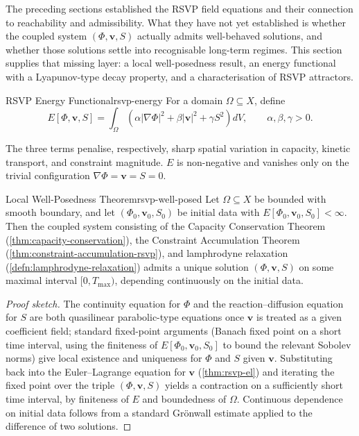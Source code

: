 \documentclass[12pt,twoside,openright]{book}
\begin{document}
The preceding sections established the RSVP field equations
and their connection to reachability and admissibility. What
they have not yet established is whether the coupled system
$(\Phi,\mathbf{v},S)$ actually admits well-behaved solutions,
and whether those solutions settle into recognisable
long-term regimes. This section supplies that missing layer:
a local well-posedness result, an energy functional with a
Lyapunov-type decay property, and a characterisation of RSVP
attractors.

\begin{definition}{RSVP Energy Functional}{rsvp-energy}
  For a domain $\Omega\subseteq X$, define
  \[
    E[\Phi,\mathbf{v},S]
    = \int_\Omega \left(
        \alpha|\nabla\Phi|^2
        + \beta|\mathbf{v}|^2
        + \gamma S^2
      \right) dV,
    \qquad \alpha,\beta,\gamma > 0.
  \]
\end{definition}

The three terms penalise, respectively, sharp spatial
variation in capacity, kinetic transport, and constraint
magnitude. $E$ is non-negative and vanishes only on the
trivial configuration $\nabla\Phi=\mathbf{v}=S=0$.

\begin{theorem}{Local Well-Posedness Theorem}{rsvp-well-posed}
  Let $\Omega\subseteq X$ be bounded with smooth boundary,
  and let $(\Phi_0,\mathbf{v}_0,S_0)$ be initial data with
  $E[\Phi_0,\mathbf{v}_0,S_0] < \infty$. Then the coupled
  system consisting of the Capacity Conservation Theorem
  (\cref{thm:capacity-conservation}), the Constraint
  Accumulation Theorem
  (\cref{thm:constraint-accumulation-rsvp}), and lamphrodyne
  relaxation (\cref{defn:lamphrodyne-relaxation}) admits a
  unique solution $(\Phi,\mathbf{v},S)$ on some maximal
  interval $[0,T_{\max})$, depending continuously on the
  initial data.
\end{theorem}

\begin{proof}[Proof sketch]
  The continuity equation for $\Phi$ and the
  reaction--diffusion equation for $S$ are both
  quasilinear parabolic-type equations once
  $\mathbf{v}$ is treated as a given coefficient field;
  standard fixed-point arguments (Banach fixed point on a
  short time interval, using the finiteness of
  $E[\Phi_0,\mathbf{v}_0,S_0]$ to bound the relevant
  Sobolev norms) give local existence and uniqueness for
  $\Phi$ and $S$ given $\mathbf{v}$. Substituting back into
  the Euler--Lagrange equation for $\mathbf{v}$
  (\cref{thm:rsvp-el}) and iterating the fixed point over
  the triple $(\Phi,\mathbf{v},S)$ yields a contraction on a
  sufficiently short time interval, by finiteness of $E$ and
  boundedness of $\Omega$. Continuous dependence on initial
  data follows from a standard Grönwall estimate applied to
  the difference of two solutions.
\end{proof}
\end{document}
